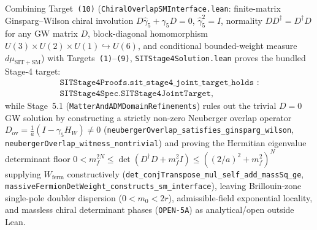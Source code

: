 Combining Target~\texttt{(10)} (\texttt{Chiral\allowbreak{}Overlap\allowbreak{}SMInterface.\allowbreak{}lean}: finite-matrix Ginsparg--Wilson chiral involution $D\hat{\gamma}_5 + \gamma_5 D = 0$, $\hat{\gamma}_5^2 = I$, normality $D D^\dagger = D^\dagger D$ for any GW matrix $D$, block-diagonal homomorphism $U(3)\times U(2)\times U(1) \hookrightarrow U(6)$, and conditional bounded-weight measure $d\mu_{\mathrm{SIT+SM}}$) with Targets~\texttt{(1)}--\texttt{(9)}, \texttt{SITStage4\allowbreak{}Solution.\allowbreak{}lean} proves the bundled Stage-4 target:
\begin{gather*}
\texttt{SITStage4Proofs.sit\_stage4\_joint\_target\_holds :}\\
\texttt{SITStage4Spec.SITStage4JointTarget},
\end{gather*}
while Stage~5.1 (\texttt{Matter\allowbreak{}And\allowbreak{}ADMDomain\allowbreak{}Refinements}) rules out the trivial $D = 0$ GW solution by constructing a strictly non-zero Neuberger overlap operator $D_{\mathrm{ov}} = \frac{1}{a}(I - \gamma_5 H_W) \ne 0$ (\texttt{neuberger\allowbreak{}Overlap\_\allowbreak{}satisfies\_\allowbreak{}ginsparg\_\allowbreak{}wilson}, \texttt{neuberger\allowbreak{}Overlap\_\allowbreak{}witness\_\allowbreak{}nontrivial}) and proving the Hermitian eigenvalue determinant floor $0 < m_f^{2N} \le \det(D^\dagger D + m_f^2 I) \le ((2/a)^2 + m_f^2)^N$ supplying $W_{\mathrm{ferm}}$ constructively (\texttt{det\_\allowbreak{}conj\allowbreak{}Transpose\_\allowbreak{}mul\_\allowbreak{}self\_\allowbreak{}add\_\allowbreak{}mass\allowbreak{}Sq\_\allowbreak{}ge}, \texttt{massive\allowbreak{}Fermion\allowbreak{}Det\allowbreak{}Weight\_\allowbreak{}constructs\_\allowbreak{}sm\_\allowbreak{}interface}), leaving Brillouin-zone single-pole doubler dispersion ($0 < m_0 < 2r$), admissible-field exponential locality, and massless chiral determinant phases (\texttt{OPEN-5A}) as analytical/open outside Lean.

